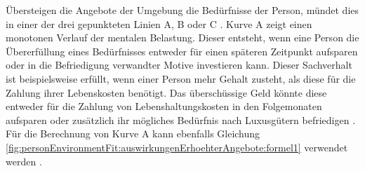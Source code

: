 Übersteigen die Angebote der Umgebung die Bedürfnisse der Person, mündet dies in einer der drei gepunkteten Linien A, B oder C \cite[S. 29ff.]{mechanismsOfJobStressAndStrain:1982}. Kurve A zeigt einen monotonen Verlauf der mentalen Belastung. Dieser entsteht, wenn eine Person die Übererfüllung eines Bedürfnisses entweder für einen späteren Zeitpunkt aufsparen oder in die Befriedigung verwandter Motive investieren kann. Dieser Sachverhalt ist beispielsweise erfüllt, wenn einer Person mehr Gehalt zusteht, als diese für die Zahlung ihrer Lebenskosten benötigt. Das überschüssige Geld könnte diese entweder für die Zahlung von Lebenshaltungskosten in den Folgemonaten aufsparen oder zusätzlich ihr mögliches Bedürfnis nach Luxusgütern befriedigen \cite[S. 30]{mechanismsOfJobStressAndStrain:1982}. Für die Berechnung von Kurve A kann ebenfalls Gleichung \ref{fig:personEnvironmentFit:auswirkungenErhoehterAngebote:formel1} verwendet werden \cite[S. 2]{edwards:1993}.

